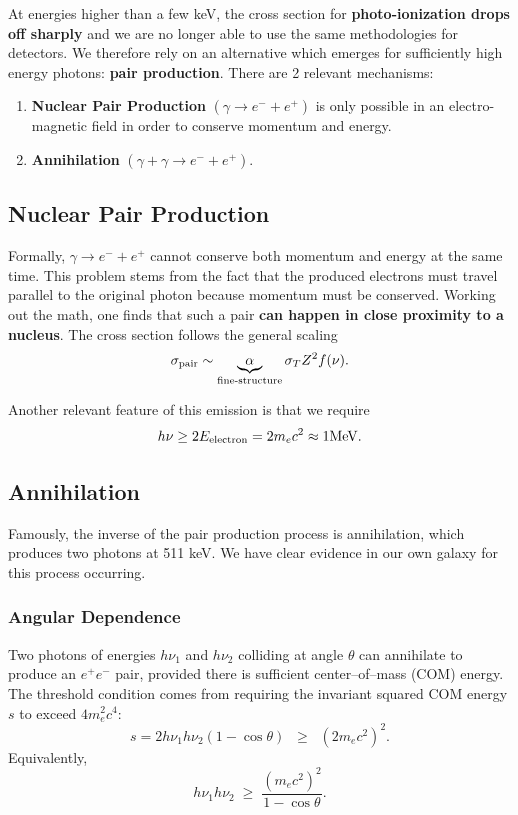 At energies higher than a few keV, the cross section for \textbf{photo-ionization drops off sharply} and we are no longer able to use the same methodologies for detectors. We therefore rely on an alternative which emerges for sufficiently high energy photons: \textbf{pair production}. There are 2 relevant mechanisms:
\begin{enumerate}
    \item \textbf{Nuclear Pair Production} $(\gamma \to e^{-} + e^{+})$ is only possible in an electro-magnetic field in order to conserve momentum and energy.
    \item \textbf{Annihilation} $(\gamma + \gamma \to e^{-} + e^{+})$.
\end{enumerate}

\subsection{Nuclear Pair Production}

Formally, $\gamma \to e^{-} + e^{+}$ cannot conserve both momentum and energy at the same time. This problem stems from the fact that the produced electrons must travel parallel to the original photon because momentum must be conserved. Working out the math, one finds that such a pair \textbf{can happen in close proximity to a nucleus}. The cross section follows the general scaling
\[
\sigma_{\rm pair} \sim \underbrace{\alpha}_{\text{fine-structure}} \sigma_T Z^2 f(\nu).
\]
\par
Another relevant feature of this emission is that we require 
\[
h \nu \ge 2 E_{\rm electron} = 2m_e c^2 \approx 1 \rm {MeV}.
\]

\subsection{Annihilation}
Famously, the inverse of the pair production process is annihilation, which produces two photons at 511 keV. We have clear evidence in our own galaxy for this process occurring.

\subsubsection{Angular Dependence}
Two photons of energies $h\nu_1$ and $h\nu_2$ colliding at angle
$\theta$ can annihilate to produce an $e^+e^-$ pair, provided there is
sufficient center--of--mass (COM) energy. The threshold condition comes
from requiring the invariant squared COM energy $s$ to exceed
$4m_e^2c^4$:
\[
    s = 2 h\nu_1 h\nu_2 (1 - \cos\theta) \;\;\geq\;\; (2m_e c^2)^2.
\]
Equivalently,
\[
    h\nu_1 h\nu_2 \;\geq\;
    \frac{(m_e c^2)^2}{1 - \cos\theta}.
\]

